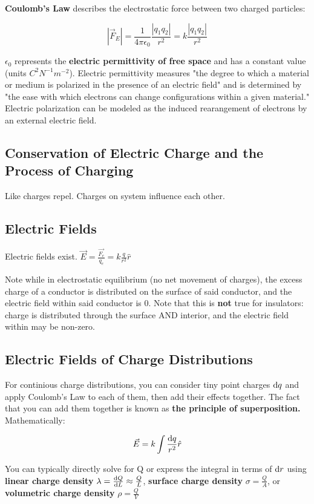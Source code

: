\documentclass{article}
\begin{document}
\textbf{Coulomb's Law} describes the electrostatic force between two charged particles:

\[|\vec{F}_E| = \frac{1}{4\pi \epsilon_0} \frac{|q_1q_2|}{r^2} = k\frac{|q_1q_2|}{r^2}\]

$\epsilon_0$ represents the \textbf{electric permittivity of free space} and has a constant value (units $\unit{C^2 N^{-1} m^{-2}}$).
Electric permittivity measures "the degree to which a material or medium is polarized in the presence of an electric field" and is determined by "the ease with which electrons can change configurations within a given material."
Electric polarization can be modeled as the induced rearangement of electrons by an external electric field.

\subsection{Conservation of Electric Charge and the Process of Charging}

Like charges repel. Charges on system influence each other.


\subsection{Electric Fields}

Electric fields exist. $\vec{E} = \frac{\vec{F_e}}{q_e} = k \frac{q}{r^2}\hat{r}$

Note while in electrostatic equilibrium (no net movement of charges), the excess charge of a conductor is distributed on the surface of said conductor, and the electric field within said conductor is 0.
Note that this is \textbf{not} true for insulators: charge is distributed through the surface AND interior, and the electric field within may be non-zero.

\subsection{Electric Fields of Charge Distributions}
For continious charge distributions, you can consider tiny point charges $\odif{q}$ and apply Coulomb's Law to each of them, then add their effects together.
The fact that you can add them together is known as \textbf{the principle of superposition.} Mathematically:

\[\vec{E} = k \int \frac{\odif{q}}{r^2} \hat{r}\]

You can typically directly solve for Q or express the integral in terms of $\odif{r}$ using \textbf{linear charge density} $\lambda = \odv{Q}{L} \approx \frac{Q}{L}$, \textbf{surface charge density} $\sigma = \frac{Q}{A}$, or \textbf{volumetric charge density} $\rho = \frac{Q}{V}$
\end{document}
